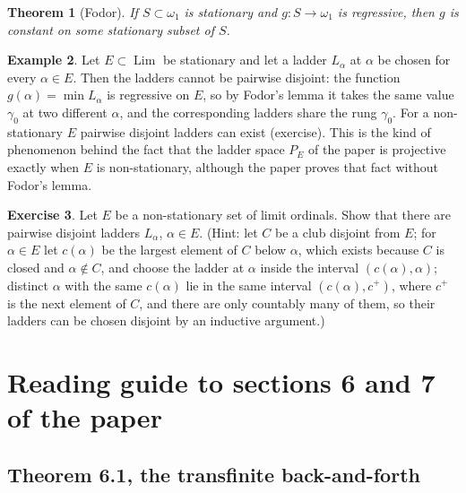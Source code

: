 \documentclass[12pt]{article}
\newtheorem{theorem}{Theorem}[section]
\theoremstyle{definition}
\newtheorem{example}[theorem]{Example}
\newtheorem{exercise}[theorem]{Exercise}
\theoremstyle{remark}
\newcommand{\Lim}{\operatorname{Lim}}
\begin{document}
\begin{theorem}[Fodor] If $S\subset\omega_1$ is stationary and $g:S\to\omega_1$
    is regressive, then $g$ is constant on some stationary subset of $S$.
\end{theorem}

\begin{example} Let $E\subset\Lim$ be stationary and let a ladder $L_\alpha$
    at $\alpha$ be chosen for every $\alpha\in E$. Then the ladders cannot be
    pairwise disjoint: the function $g(\alpha)=\min L_\alpha$ is regressive on
    $E$, so by Fodor's lemma it takes the same value $\gamma_0$ at two
    different $\alpha$, and the corresponding ladders share the rung
    $\gamma_0$. For a non-stationary $E$ pairwise disjoint ladders can exist
    (exercise). This is the kind of phenomenon behind the fact that the
    ladder space $P_E$ of the paper is projective exactly when $E$ is
    non-stationary, although the paper proves that fact without Fodor's
    lemma.
\end{example}

\begin{exercise} Let $E$ be a non-stationary set of limit ordinals. Show that
    there are pairwise disjoint ladders $L_\alpha$, $\alpha\in E$. (Hint: let
    $C$ be a club disjoint from $E$; for $\alpha\in E$ let $c(\alpha)$ be the
    largest element of $C$ below $\alpha$, which exists because $C$ is closed
    and $\alpha\notin C$, and choose the ladder at $\alpha$ inside the
    interval $(c(\alpha),\alpha)$; distinct $\alpha$ with the same $c(\alpha)$
    lie in the same interval $(c(\alpha),c^+)$, where $c^+$ is the next element
    of $C$, and there are only countably many of them, so their ladders can
    be chosen disjoint by an inductive argument.)
\end{exercise}

\section{Reading guide to sections 6 and 7 of the paper}\label{SecReading}

\subsection*{Theorem 6.1, the transfinite back-and-forth}
\end{document}
